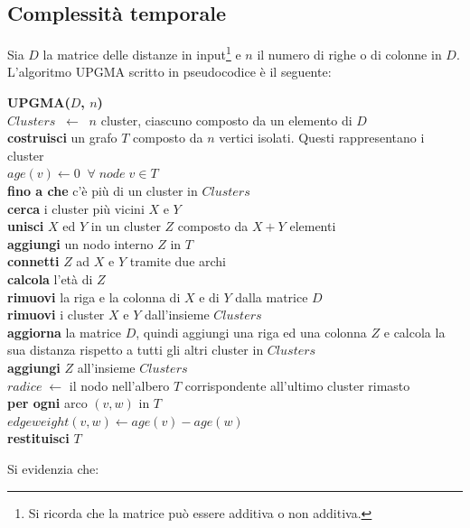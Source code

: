 \subsection{Complessità temporale}
Sia $D$ la matrice delle distanze in input\footnote{Si ricorda che la matrice può essere additiva o non additiva.} e $n$ il numero di righe o di colonne in $D$. L'algoritmo UPGMA scritto in pseudocodice è il seguente:
\begin{framed}\noindent
  \textbf{UPGMA($D$, $n$)}\\
   $Clusters \;\; \leftarrow \;\; n$ cluster, ciascuno composto da un elemento di $D$ \\
  \textbf{costruisci} un grafo $T$ composto da $n$ vertici isolati. Questi rappresentano i cluster \\
  $age(v)\leftarrow 0 \;\; \forall \; node \; v \in T$\\
  \textbf{fino a che} c'è più di un cluster in $Clusters$ \\
  \indent \textbf{cerca} i cluster più vicini $X$ e $Y$\\
  \indent \textbf{unisci} $X$ ed $Y$ in un cluster $Z$ composto da $X+Y$ elementi\\
  \indent \textbf{aggiungi} un nodo interno $Z$ in $T$\\
  \indent \textbf{connetti} $Z$ ad $X$ e $Y$ tramite due archi \\
  \indent \textbf{calcola} l'età di $Z$\\
  \indent \textbf{rimuovi} la riga e la colonna di $X$ e di $Y$ dalla matrice $D$ \\
  \indent \textbf{rimuovi} i cluster $X$ e $Y$ dall'insieme $Clusters$ \\
  \indent \textbf{aggiorna} la matrice $D$, quindi aggiungi una riga ed una colonna $Z$ \indent e calcola la sua distanza rispetto a tutti gli altri cluster in $Clusters$ \\
  \indent \textbf{aggiungi} $Z$ all'insieme $Clusters$ \\
  $radice \; \leftarrow $ il nodo nell'albero $T$ corrispondente all'ultimo cluster rimasto \\
  \textbf{per ogni} arco $(v, w)$ in $T$\\
  \indent $edgeweight(v, w) \leftarrow age(v) - age(w) $\\
  \textbf{restituisci} $T$
\end{framed}
Si evidenzia che:
